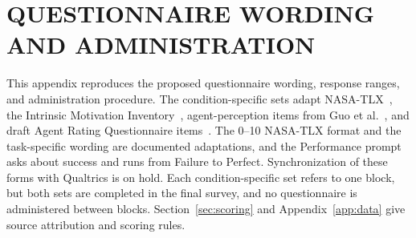 \chapter{QUESTIONNAIRE WORDING AND ADMINISTRATION}\label{app:instruments}
\newpage
This appendix reproduces the proposed questionnaire wording, response ranges, and administration procedure. The condition-specific sets adapt NASA-TLX~\cite{hart1988nasatlx}, the Intrinsic Motivation Inventory~\cite{ryan1982control,mcauley1989imi}, agent-perception items from Guo et al.~\cite{guo2024doppelganger}, and draft Agent Rating Questionnaire items~\cite{wang2020terrible,venkatakrishnan2026clarifying}. The 0--10 NASA-TLX format and the task-specific wording are documented adaptations, and the Performance prompt asks about success and runs from Failure to Perfect. Synchronization of these forms with Qualtrics is on hold. Each condition-specific set refers to one block, but both sets are completed in the final survey, and no questionnaire is administered between blocks. Section~\ref{sec:scoring} and Appendix~\ref{app:data} give source attribution and scoring rules.


\newcommand{\surveybubble}{{\fontencoding{OMS}\fontfamily{cmsy}\fontseries{m}\fontshape{n}\fontsize{10}{10}\selectfont\char"0D}}
\newcommand{\surveychoice}[1]{\mbox{\surveybubble\ #1}\hspace{0.8em}\allowbreak}
\newcommand{\surveyseven}[3]{%
  \par\nopagebreak\smallskip{\small\noindent
  \surveybubble\ 1\hfill\surveybubble\ 2\hfill\surveybubble\ 3\hfill
  \surveybubble\ 4\hfill\surveybubble\ 5\hfill\surveybubble\ 6\hfill\surveybubble\ 7\par
  \noindent\makebox[0pt][l]{#1}\hfill #2\hfill\makebox[0pt][r]{#3}\par}}
\newcommand{\surveytlx}[2]{%
  \par\nopagebreak\smallskip{\small\noindent
  \surveybubble\ 0\hfill\surveybubble\ 1\hfill\surveybubble\ 2\hfill
  \surveybubble\ 3\hfill\surveybubble\ 4\hfill\surveybubble\ 5\hfill
  \surveybubble\ 6\hfill\surveybubble\ 7\hfill\surveybubble\ 8\hfill
  \surveybubble\ 9\hfill\surveybubble\ 10\par
  \noindent #1\hfill #2\par}}
\newcommand{\surveysevenpair}[3]{%
  \par\nopagebreak\smallskip{\small\noindent\textit{Selected Voice}\par}\nopagebreak\surveyseven{#1}{#2}{#3}%
  \nopagebreak{\small\noindent\textit{Self-Similar Voice}\par}\nopagebreak\surveyseven{#1}{#2}{#3}}
\newcommand{\surveytlxpair}[2]{%
  \par\nopagebreak\smallskip{\small\noindent\textit{Selected Voice}\par}\nopagebreak\surveytlx{#1}{#2}%
  \nopagebreak{\small\noindent\textit{Self-Similar Voice}\par}\nopagebreak\surveytlx{#1}{#2}}
\newcommand{\surveywrite}{\par\nopagebreak\noindent\rule{\linewidth}{0.3pt}\par}

